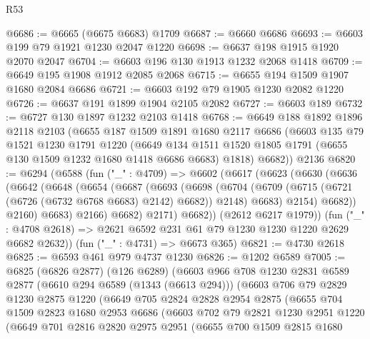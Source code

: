 \begin{lexlean}{R53}
\begin{coremodule}
@6686 := @6665 (@6675 @6683) @1709
@6687 := @6660 @6686
@6693 := @6603 @199 @79 @1921 @1230 @2047 @1220
@6698 := @6637 @198 @1915 @1920 @2070 @2047
@6704 := @6603 @196 @130 @1913 @1232 @2068 @1418
@6709 := @6649 @195 @1908 @1912 @2085 @2068
@6715 := @6655 @194 @1509 @1907 @1680 @2084 @6686
@6721 := @6603 @192 @79 @1905 @1230 @2082 @1220
@6726 := @6637 @191 @1899 @1904 @2105 @2082
@6727 := @6603 @189
@6732 := @6727 @130 @1897 @1232 @2103 @1418
@6768 := @6649
    @188
    @1892
    @1896
    @2118
    @2103
    (@6655
      @187
      @1509
      @1891
      @1680
      @2117
      @6686
      (@6603
        @135
        @79
        @1521
        @1230
        @1791
        @1220
        (@6649 @134 @1511 @1520 @1805 @1791 (@6655 @130 @1509 @1232 @1680 @1418 @6686 @6683) @1818)
        @6682))
    @2136
@6820 := @6294
    (@6588
      (fun ("_" : @4709) =>
      @6602
        (@6617
          (@6623
            (@6630
              (@6636
                (@6642
                  (@6648
                    (@6654
                      (@6687
                        (@6693
                          (@6698
                            (@6704
                              (@6709 (@6715 (@6721 (@6726 (@6732 @6768 @6683) @2142) @6682)) @2148)
                              @6683)
                            @2154)
                          @6682))
                      @2160)
                    @6683)
                  @2166)
                @6682)
              @2171)
            @6682))
        (@2612 @6217 @1979))
      (fun ("_" : @4708 @2618) => @2621 @6592 @231 @61 @79 @1230 @1230 @1220 @2629 @6682 @2632))
    (fun ("_" : @4731) => @6673 @365)
@6821 := @4730 @2618
@6825 := @6593 @461 @979 @4737 @1230
@6826 := @1202 @6589
@7005 := @6825
    (@6826 @2877)
    (@126 @6289)
    (@6603
      @966
      @708
      @1230
      @2831
      @6589
      @2877
      (@6610 @294 @6589 (@1343 (@6613 @294)))
      (@6603
        @706
        @79
        @2829
        @1230
        @2875
        @1220
        (@6649
          @705
          @2824
          @2828
          @2954
          @2875
          (@6655
            @704
            @1509
            @2823
            @1680
            @2953
            @6686
            (@6603
              @702
              @79
              @2821
              @1230
              @2951
              @1220
              (@6649
                @701
                @2816
                @2820
                @2975
                @2951
                (@6655
                  @700
                  @1509
                  @2815
                  @1680

\end{coremodule}
\end{lexlean}
